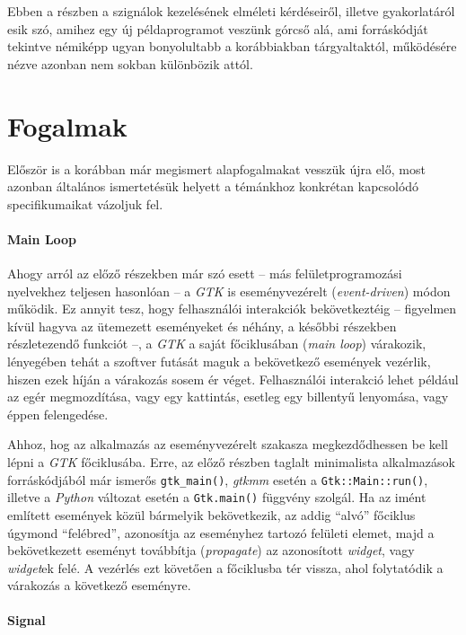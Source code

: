 Ebben a részben a szignálok kezelésének elméleti kérdéseiről, illetve gyakorlatáról esik szó, amihez egy új példaprogramot veszünk górcső alá, ami forráskódját tekintve némiképp ugyan bonyolultabb a korábbiakban tárgyaltaktól, működésére nézve azonban nem sokban különbözik attól.

\section{Fogalmak}

Először is a korábban már megismert alapfogalmakat vesszük újra elő, most azonban általános ismertetésük helyett a témánkhoz konkrétan kapcsolódó specifikumaikat vázoljuk fel.

\paragraph{Main Loop}

Ahogy arról az előző részekben már szó esett -- más felületprogramozási nyelvekhez teljesen hasonlóan -- a \textit{GTK} is eseményvezérelt (\textit{event-driven}) módon működik. Ez annyit tesz, hogy felhasználói interakciók bekövetkeztéig -- figyelmen kívül hagyva az ütemezett eseményeket és néhány, a későbbi részekben részletezendő funkciót --, a \textit{GTK} a saját főciklusában (\textit{main loop}) várakozik, lényegében tehát a szoftver futását maguk a bekövetkező események vezérlik, hiszen ezek híján a várakozás sosem ér véget. Felhasználói interakció lehet például az egér megmozdítása, vagy egy kattintás, esetleg egy billentyű lenyomása, vagy éppen felengedése.

Ahhoz, hog az alkalmazás az eseményvezérelt szakasza megkezdődhessen be kell lépni a \textit{GTK} főciklusába. Erre, az előző részben taglalt minimalista alkalmazások forráskódjából már ismerős \texttt{gtk\_main()}, \textit{gtkmm} esetén a \texttt{Gtk::Main::run()}, illetve a \textit{Python} változat esetén a \texttt{Gtk.main()} függvény szolgál. Ha az imént említett események közül bármelyik bekövetkezik, az addig ``alvó'' főciklus úgymond ``felébred'', azonosítja az eseményhez tartozó felületi elemet, majd a bekövetkezett eseményt továbbítja (\textit{propagate}) az azonosított \textit{widget}, vagy \textit{widget}ek felé. A vezérlés ezt követően a főciklusba tér vissza, ahol folytatódik a várakozás a következő eseményre. 

\paragraph{Signal}


